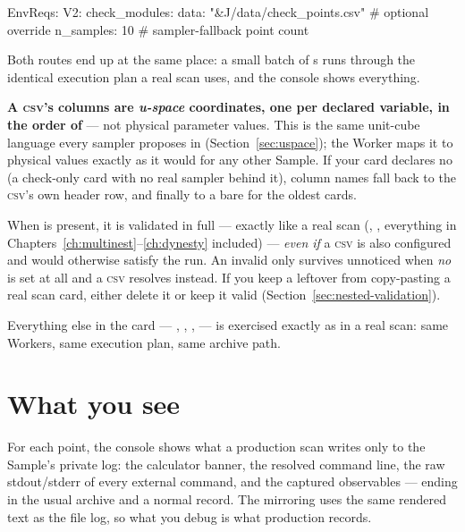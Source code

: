 \begin{yamlwin}
EnvReqs:
  V2:
    check_modules:
      data: "&J/data/check_points.csv"   # optional override
      n_samples: 10                        # sampler-fallback point count
\end{yamlwin}

Both routes end up at the same place: a small batch of s runs through the
identical execution plan a real scan uses, and the console shows everything.

\begin{jnote}
\textbf{A \textsc{csv}'s columns are \emph{u-space} coordinates, one per declared
variable, in the order of } --- not physical parameter
values. This is the same unit-cube language every sampler proposes in
(Section~\ref{sec:uspace}); the Worker maps it to physical values exactly as it would
for any other Sample. If your card declares no  (a check-only card
with no real sampler behind it), column names fall back to the \textsc{csv}'s own
header row, and finally to a bare  for the oldest cards.
\end{jnote}

\begin{jwarn}
When  is present, it is validated in full --- exactly like a
real scan (, , everything in
Chapters~\ref{ch:multinest}--\ref{ch:dynesty} included) --- \emph{even if} a
\textsc{csv} is also configured and would otherwise satisfy the run. An invalid
 only survives unnoticed when \emph{no}  is set at
all and a \textsc{csv} resolves instead. If you keep a leftover  from
copy-pasting a real scan card, either delete it or keep it valid
(Section~\ref{sec:nested-validation}).
\end{jwarn}

Everything else in the card --- , ,
,  --- is exercised exactly as in a real scan:
same Workers, same execution plan, same archive path.

\section{What you see}
\label{sec:check-output}

For each point, the console shows what a production scan writes only to the Sample's
private log: the calculator banner, the resolved command line, the raw
stdout/stderr of every external command, and the captured observables --- ending in the
usual archive and a normal  record. The mirroring uses the same
rendered text as the file log, so what you debug is what production records.

